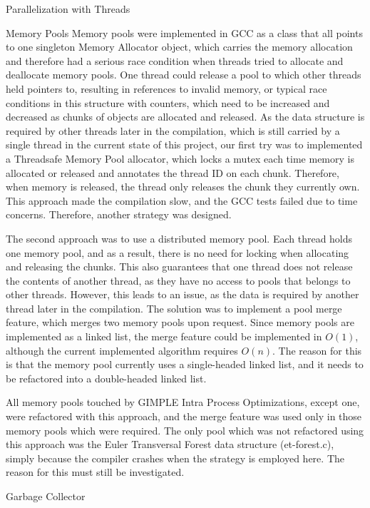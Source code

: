 \begin{section}{Parallelization with Threads}
\begin{subsection}{Memory Pools}
Memory pools were implemented in GCC as a class that all points to one
singleton Memory Allocator object, which carries the memory allocation and
therefore had a serious race condition when threads tried to allocate and
deallocate memory pools. One thread could release a pool to which other threads
held pointers to, resulting in references to invalid memory, or typical race
conditions in this structure with counters, which need to be increased and
decreased as chunks of objects are allocated and released. 
As the data structure is required by other threads later in the compilation,
which is still carried by a single thread in the current state of this project,
our first try was to implemented a Threadsafe Memory Pool allocator, which
locks a mutex each time memory is allocated or released and annotates the
thread ID on each chunk. Therefore, when memory is released, the thread only
releases the chunk they currently own. This approach made the compilation slow,
and the GCC tests failed due to time concerns. Therefore, another strategy was
designed. 

The second approach was to use a distributed memory pool. Each thread holds one
memory pool, and as a result, there is no need for locking when allocating and
releasing the chunks. This also guarantees that one thread does not release the
contents of another thread, as they have no access to pools that belongs to
other threads. However, this leads to an issue, as the data is required by
another thread later in the compilation. The solution was to implement a pool
merge feature, which merges two memory pools upon request. Since memory pools
are implemented as a linked list, the merge feature could be implemented in
$O(1)$, although the current implemented algorithm requires $O(n)$. The reason for
this is that the memory pool currently uses a single-headed linked list, and it
needs to be refactored into a double-headed linked list. 

All memory pools touched by GIMPLE Intra Process Optimizations, except one,
were refactored with this approach, and the merge feature was used only in
those memory pools which were required. The only pool which was not refactored
using this approach was the Euler Transversal Forest data structure
(et-forest.c), simply because the compiler crashes when the strategy is
employed here. The reason for this must still be investigated.

\end{subsection}

\begin{subsection}{Garbage Collector}


\end{subsection}
\end{section}
